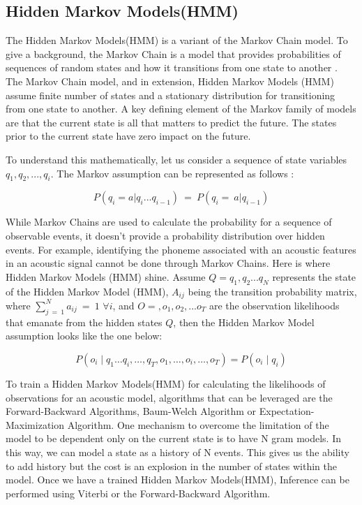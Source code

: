 \subsection{Hidden Markov Models(HMM)}%
\label{sec:hmm}

The Hidden Markov Models(HMM) is a variant of the Markov Chain model. To give a background, the Markov Chain is a model that provides probabilities of sequences of random states and how it transitions from one state to another \cite{gales2008application}. The Markov Chain model, and in extension, Hidden Markov Models (HMM) assume finite number of states and a stationary distribution for transitioning from one state to another. A key defining element of the Markov family of models are that the current state is all that matters to predict the future. The states prior to the current state have zero impact on the future.

To understand this mathematically, let us consider a sequence of state variables $q_1,q_2,...,q_i$. The Markov assumption can be represented as follows :

\begin{equation}
P(q_i = a|q_i...q_{i-1})\ =\ P(q_i=\ a|q_{i-1})
\end{equation}

While Markov Chains are used to calculate the probability for a sequence of observable events, it doesn't provide a probability distribution over hidden events. For example, identifying the phoneme associated with an acoustic features in an acoustic signal cannot be done through Markov Chains. Here is where Hidden Markov Models (HMM) shine. Assume $Q = q_1, q_2 ... q_N$ represents the state of the Hidden Markov Model (HMM),  $A_{ij}$ being the transition probability matrix, where $\sum_{j\ =\ 1}^{N}{a_{ij}\ =\ 1}$   $\forall{i}$, and $O = ,o_1,o_2, ...o_T$ are the observation likelihoods that emanate from the hidden states $Q$, then the Hidden Markov Model assumption looks like the one below:

\begin{equation}
P\left(o_i \mid q_1 \ldots q_i, \ldots, q_T, o_1, \ldots, o_i, \ldots, o_T\right)=P\left(o_i \mid q_i\right)
\end{equation}

To train a Hidden Markov Models(HMM) for calculating the likelihoods of observations for an acoustic model, algorithms that can be leveraged are the Forward-Backward Algorithms, Baum-Welch Algorithm or Expectation-Maximization Algorithm. One mechanism to overcome the limitation of the model to be dependent only on the current state is to have N gram models. In this way, we can model a state as a history of N events. This gives us the ability to add history but the cost is an explosion in the number of states within the model. Once we have a trained Hidden Markov Models(HMM), Inference can be performed using Viterbi or the Forward-Backward Algorithm.


